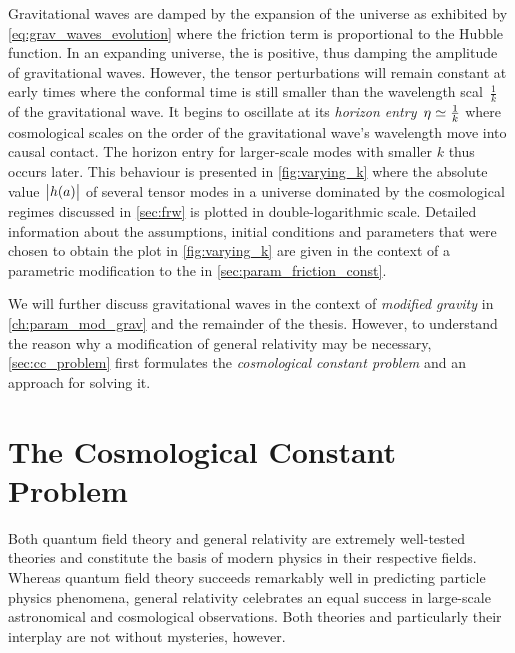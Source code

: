 \documentclass[12pt,parskip=half]{scrreprt}
\begin{document}
Gravitational waves are damped by the expansion of the universe as exhibited by \eqref{eq:grav_waves_evolution} where the friction term is proportional to the Hubble function. In an expanding universe, the  is positive, thus damping the amplitude of gravitational waves. However, the tensor perturbations will remain constant at early times where the conformal time is still smaller than the wavelength scal~\(\frac{1}{k}\) of the gravitational wave. It begins to oscillate at its \emph{horizon entry}~\(\eta \simeq \frac{1}{k}\) where cosmological scales on the order of the gravitational wave's wavelength move into causal contact. The horizon entry for larger-scale modes with smaller \(k\) thus occurs later. This behaviour is presented in \autoref{fig:varying_k} where the absolute value~\(\abs{h(a)}\) of several tensor modes in a universe dominated by the cosmological regimes discussed in \autoref{sec:frw} is plotted in double-logarithmic scale. Detailed information about the assumptions, initial conditions and parameters that were chosen to obtain the plot in \autoref{fig:varying_k} are given in the context of a parametric modification to the  in \autoref{sec:param_friction_const}.





We will further discuss gravitational waves in the context of \emph{modified gravity} in \autoref{ch:param_mod_grav} and the remainder of the thesis. However, to understand the reason why a modification of general relativity may be necessary, \autoref{sec:cc_problem} first formulates the \emph{cosmological constant problem} and an approach for solving it.

\section{The Cosmological Constant Problem}\label{sec:cc_problem}

Both quantum field theory and general relativity are extremely well-tested theories and constitute the basis of modern physics in their respective fields. Whereas quantum field theory succeeds remarkably well in predicting particle physics phenomena, general relativity celebrates an equal success in large-scale astronomical and cosmological observations. Both theories and particularly their interplay are not without mysteries, however.
\end{document}
